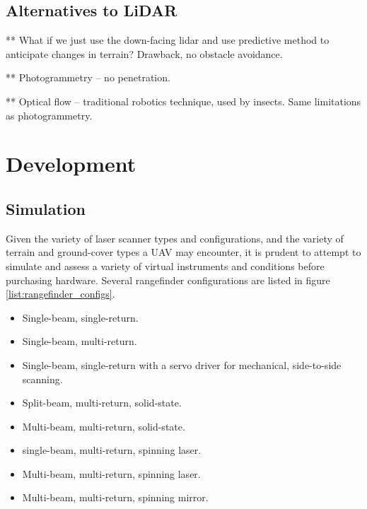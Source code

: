 \documentclass[10pt,a4paper]{report}
\begin{document}
\subsection{Alternatives to LiDAR}

** What if we just use the down-facing lidar and use predictive method to anticipate changes in terrain? Drawback, no obstacle avoidance.

** Photogrammetry -- no penetration.

** Optical flow -- traditional robotics technique, used by insects. Same limitations as photogrammetry.


\section{Development}


\subsection{Simulation}

Given the variety of laser scanner types and configurations, and the variety of terrain and ground-cover types a UAV may encounter, it is prudent to attempt to simulate and assess a variety of virtual instruments and conditions before purchasing hardware. Several rangefinder configurations are listed in figure \ref{list:rangefinder_configs}.

\begin{itemize}
\item Single-beam, single-return.
\item Single-beam, multi-return.
\item Single-beam, single-return with a servo driver for mechanical, side-to-side scanning.
\item Split-beam, multi-return, solid-state.
\item Multi-beam, multi-return, solid-state.
\item single-beam, multi-return, spinning laser.
\item Multi-beam, multi-return, spinning laser.
\item Multi-beam, multi-return, spinning mirror.
\label{list:rangefinder_configs}
\end{itemize}
\end{document}
